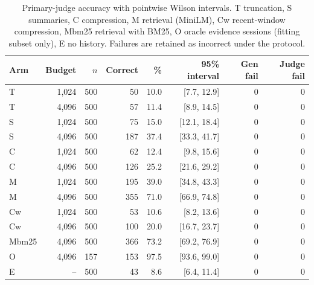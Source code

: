 {\begin{table}[htbp]\centering\small\setlength{\tabcolsep}{4pt}
\begin{tabular}{lrrrrrrr}\toprule
Arm & Budget & $n$ & Correct & \% & 95\% interval & Gen fail & Judge fail\\ \midrule
T & 1,024 & 500 & 50 & 10.0 & [7.7, 12.9] & 0 & 0\\
T & 4,096 & 500 & 57 & 11.4 & [8.9, 14.5] & 0 & 0\\
S & 1,024 & 500 & 75 & 15.0 & [12.1, 18.4] & 0 & 0\\
S & 4,096 & 500 & 187 & 37.4 & [33.3, 41.7] & 0 & 0\\
C & 1,024 & 500 & 62 & 12.4 & [9.8, 15.6] & 0 & 0\\
C & 4,096 & 500 & 126 & 25.2 & [21.6, 29.2] & 0 & 0\\
M & 1,024 & 500 & 195 & 39.0 & [34.8, 43.3] & 0 & 0\\
M & 4,096 & 500 & 355 & 71.0 & [66.9, 74.8] & 0 & 0\\
Cw & 1,024 & 500 & 53 & 10.6 & [8.2, 13.6] & 0 & 0\\
Cw & 4,096 & 500 & 100 & 20.0 & [16.7, 23.7] & 0 & 0\\
Mbm25 & 4,096 & 500 & 366 & 73.2 & [69.2, 76.9] & 0 & 0\\
O & 4,096 & 157 & 153 & 97.5 & [93.6, 99.0] & 0 & 0\\
E & -- & 500 & 43 & 8.6 & [6.4, 11.4] & 0 & 0\\
\bottomrule\end{tabular}
\caption{Primary-judge accuracy with pointwise Wilson intervals. T truncation, S summaries, C compression, M retrieval (MiniLM), Cw recent-window compression, Mbm25 retrieval with BM25, O oracle evidence sessions (fitting subset only), E no history. Failures are retained as incorrect under the protocol.}\label{tab:p5-grid}
\end{table}

}
